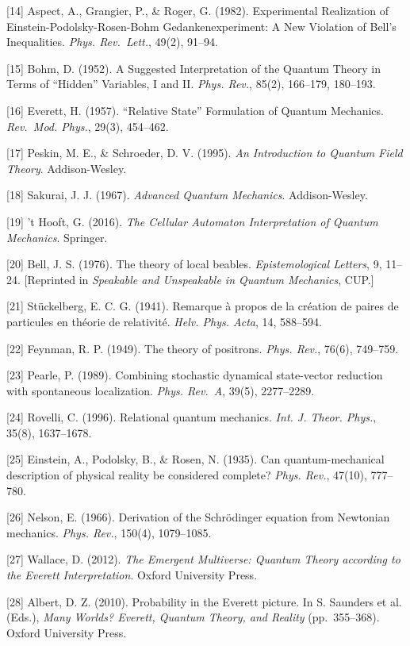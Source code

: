 \documentclass[
]{article}
\begin{document}
{[}14{]} Aspect, A., Grangier, P., \& Roger, G. (1982). Experimental
Realization of Einstein-Podolsky-Rosen-Bohm Gedankenexperiment: A New
Violation of Bell's Inequalities. \emph{Phys. Rev.~Lett.}, 49(2),
91--94.

{[}15{]} Bohm, D. (1952). A Suggested Interpretation of the Quantum
Theory in Terms of ``Hidden'' Variables, I and II. \emph{Phys. Rev.},
85(2), 166--179, 180--193.

{[}16{]} Everett, H. (1957). ``Relative State'' Formulation of Quantum
Mechanics. \emph{Rev.~Mod. Phys.}, 29(3), 454--462.

{[}17{]} Peskin, M. E., \& Schroeder, D. V. (1995). \emph{An
Introduction to Quantum Field Theory}. Addison-Wesley.

{[}18{]} Sakurai, J. J. (1967). \emph{Advanced Quantum Mechanics}.
Addison-Wesley.

{[}19{]} 't Hooft, G. (2016). \emph{The Cellular Automaton
Interpretation of Quantum Mechanics}. Springer.

{[}20{]} Bell, J. S. (1976). The theory of local beables.
\emph{Epistemological Letters}, 9, 11--24. {[}Reprinted in
\emph{Speakable and Unspeakable in Quantum Mechanics}, CUP.{]}

{[}21{]} Stückelberg, E. C. G. (1941). Remarque à propos de la création
de paires de particules en théorie de relativité. \emph{Helv. Phys.
Acta}, 14, 588--594.

{[}22{]} Feynman, R. P. (1949). The theory of positrons. \emph{Phys.
Rev.}, 76(6), 749--759.

{[}23{]} Pearle, P. (1989). Combining stochastic dynamical state-vector
reduction with spontaneous localization. \emph{Phys. Rev.~A}, 39(5),
2277--2289.

{[}24{]} Rovelli, C. (1996). Relational quantum mechanics. \emph{Int. J.
Theor. Phys.}, 35(8), 1637--1678.

{[}25{]} Einstein, A., Podolsky, B., \& Rosen, N. (1935). Can
quantum-mechanical description of physical reality be considered
complete? \emph{Phys. Rev.}, 47(10), 777--780.

{[}26{]} Nelson, E. (1966). Derivation of the Schrödinger equation from
Newtonian mechanics. \emph{Phys. Rev.}, 150(4), 1079--1085.

{[}27{]} Wallace, D. (2012). \emph{The Emergent Multiverse: Quantum
Theory according to the Everett Interpretation}. Oxford University
Press.

{[}28{]} Albert, D. Z. (2010). Probability in the Everett picture. In S.
Saunders et al. (Eds.), \emph{Many Worlds? Everett, Quantum Theory, and
Reality} (pp.~355--368). Oxford University Press.
\end{document}
